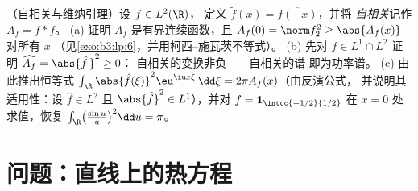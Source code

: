 \begin{exercise}[$\star\star$]\label{exo:b3:fouriertransform:12}
（自相关与维纳引理）设 $f \in L^2(\R)$，
定义 $\tilde f(x) = \overline{f(-x)}$，并将
\emph{自相关}记作 $A_f = f * \tilde f$。
(a) 证明 $A_f$ 是有界连续函数，且
$A_f(0) = \norm f_2^2 \geq \abs{A_f(x)}$ 对所有 $x$
（见\cref{exo:b3:lp:6}，并用柯西–施瓦茨不等式）。
(b) 先对 $f \in L^1\cap L^2$ 证明
$\widehat{A_f} = \abs{\hat f\,}^2 \geq 0$：
自相关的变换非负——自相关的谱
即为功率谱。
(c) 由此推出恒等式 $\int_\R\abs{\hat
f(\xi)}^2\eu^{\iu x\xi}\,\dd\xi = 2\pi A_f(x)$（由反演公式，
并说明其适用性：设 $\hat f \in L^2$ 且
$\abs{\hat f}^2 \in L^1$），并对 $f = \mathbf
1_{\intcc{-1/2}{1/2}}$ 在 $x = 0$ 处求值，恢复
$\int_\R\bigl(\frac{\sin u}u\bigr)^2\dd u = \pi$。
\end{exercise}

\section{问题：直线上的热方程}

